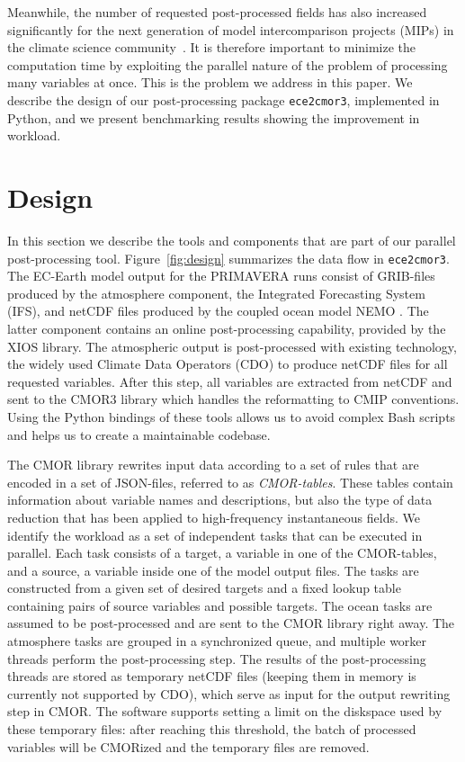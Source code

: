 \documentclass[procedia]{easychair}
\begin{document}
Meanwhile, the number of requested post-processed fields has also increased significantly for the next generation of model intercomparison projects (MIPs) in the climate 
science community~\cite{eyri:2016b}.
It is therefore important to minimize the 
computation time by 
exploiting the parallel nature of the problem of processing many variables at once.
This is the problem we address in this paper.  
We describe the design of our post-processing package \texttt{ece2cmor3}, implemented in Python, and 
we present benchmarking results showing the improvement in workload. 


\section{Design}

In this section we describe the tools and components that 
are part of our parallel post-processing tool. Figure~\ref{fig:design} summarizes the data flow in \texttt{ece2cmor3}. 
% 
The EC-Earth model output for the PRIMAVERA runs consist of GRIB-files produced 
by the atmosphere component, the Integrated Forecasting System (IFS), and 
netCDF files produced by the coupled ocean model NEMO \cite{NEMO}. The latter 
component 
contains an online post-processing capability, provided by the XIOS library. The 
atmospheric output is post-processed with existing technology, the widely used 
Climate Data Operators (CDO) \cite{CDO} to produce netCDF files for all 
requested 
variables. After this step, all variables are extracted from netCDF and sent to 
the CMOR3 library \cite{CMOR} which handles the reformatting to CMIP 
conventions. Using the 
Python bindings of these tools allows us to avoid complex Bash scripts and 
helps us to create a maintainable codebase.

The CMOR library rewrites input data according to a set of rules that are 
encoded in a set of JSON-files, referred to as \emph{CMOR-tables}. These tables 
contain information about variable names and descriptions, but also the type of 
data reduction that has been applied to high-frequency instantaneous fields. We 
identify the workload as a set of independent tasks that can be executed in 
parallel. Each task consists of a target, a variable in one of the CMOR-tables, 
and a source, a variable inside one of the model output files. The tasks are 
constructed from a given set of desired targets and a fixed lookup table 
containing pairs of source variables and possible targets. The ocean tasks 
are assumed to be post-processed and are sent to the CMOR library right away. 
The atmosphere tasks are grouped in a synchronized queue, and multiple worker 
threads perform the post-processing step. The results of the post-processing 
threads are stored as temporary netCDF files (keeping them in memory is 
currently not supported by CDO), which serve as input for the output rewriting 
step in CMOR. The software supports setting a limit on the diskspace used by 
these temporary files: after reaching this threshold, the batch of processed 
variables will be CMORized and the temporary files are removed.
\end{document}
